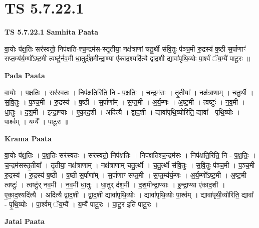 \documentclass[17pt]{extarticle}
\begin{document}
\section{ TS 5.7.22.1 }

\textbf{TS 5.7.22.1 } \newline
\textbf{Samhita Paata} \newline

वा॒योः प॑क्ष॒तिः सर॑स्वतो॒ निप॑क्षति-श्च॒न्द्रम॑स-स्तृ॒तीया॒ नक्ष॑त्राणां चतु॒र्थी स॑वि॒तुः प॑ञ्च॒मी रु॒द्रस्य॑ ष॒ष्ठी स॒र्पाणाꣳ॑ सप्त॒म्य॑र्य॒म्णो᳚ऽष्ट॒मी त्वष्टु॑र्नव॒मी धा॒तुर्द॑श॒मीन्द्रा॒ण्या ए॑काद॒श्यदि॑त्यै द्वाद॒शी द्यावा॑पृथि॒व्योः पा॒र्श्वं ॅय॒म्यै॑ पाटू॒रः ॥ \newline

\textbf{Pada Paata} \newline

वा॒योः । प॒क्ष॒तिः । सर॑स्वतः । निप॑क्षति॒रिति॒ नि - प॒क्ष॒तिः॒ । च॒न्द्रम॑सः । तृ॒तीया᳚ । नक्ष॑त्राणाम् । च॒तु॒र्थी । स॒वि॒तुः । प॒ञ्च॒मी । रु॒द्रस्य॑ । ष॒ष्ठी । स॒र्पाणा᳚म् । स॒प्त॒मी । अ॒र्य॒म्णः । अ॒ष्ट॒मी । त्वष्टुः॑ । न॒व॒मी । धा॒तुः । द॒श॒मी । इ॒न्द्रा॒ण्याः । ए॒का॒द॒शी । अदि॑त्यै । द्वा॒द॒शी । द्यावा॑पृथि॒व्योरिति॒ द्यावा᳚ - पृ॒थि॒व्योः । पा॒र्श्वम् । य॒म्यै᳚ । पा॒टू॒रः ॥  \newline


\textbf{Krama Paata} \newline

वा॒योः प॑क्ष॒तिः । प॒क्ष॒तिः सर॑स्वतः । सर॑स्वतो॒ निप॑क्षतिः । निप॑क्षतिश्च॒न्द्रम॑सः । निप॑क्षति॒रिति॒ नि - प॒क्ष॒तिः॒ । च॒न्द्रम॑सस्तृ॒तीया᳚ । तृ॒तीया॒ नक्ष॑त्राणाम् । नक्ष॑त्राणाम् चतु॒र्त्थी । च॒तु॒र्त्थी स॑वि॒तुः । स॒वि॒तुः प॑ञ्च॒मी । प॒ञ्च॒मी रु॒द्रस्य॑ । रु॒द्रस्य॑ ष॒ष्ठी । ष॒ष्ठी स॒र्पाणा᳚म् । स॒र्पाणाꣳ॑ सप्त॒मी । स॒प्त॒म्य॑र्य॒म्णः । अ॒र्य॒म्णो᳚ऽष्ट॒मी । अ॒ष्ट॒मी त्वष्टुः॑ । त्वष्टु॑र् नव॒मी । न॒व॒मी धा॒तुः । धा॒तुर् द॑श॒मी । द॒श॒मीन्द्रा॒ण्याः । इ॒न्द्रा॒ण्या ए॑काद॒शी । ए॒का॒द॒श्यदि॑त्यै । अदि॑त्यै द्वाद॒शी । द्वा॒द॒शी द्यावा॑पृथि॒व्योः । द्यावा॑पृथि॒व्योः पा॒र्श्वम् । द्यावा॑पृथी॒व्योरिति॒ द्यावा᳚ - पृ॒थि॒व्योः । पा॒र्श्वम् ॅय॒म्यै᳚ । य॒म्यै॑ पाटू॒रः । पा॒टू॒र इति॑ पाटू॒रः । \newline

\textbf{Jatai Paata} \newline
\end{document}
